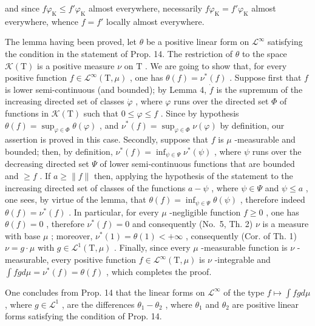 and since \(f\varphi_{\mathrm{K}} \leqslant f'\varphi_{\mathrm{K}}\) almost everywhere, necessarily \(f\varphi_{\mathrm{K}} = f'\varphi_{\mathrm{K}}\) almost everywhere, whence \(f = f'\) locally almost everywhere.

The lemma having been proved, let \(\theta\) be a positive linear form on \(\mathcal{L}^{\infty}\) satisfying the condition in the statement of Prop. 14. The restriction of \(\theta\) to the space \(\mathcal{K}(\mathrm{T})\) is a positive measure \(\nu\) on \(\mathrm{T}\) . We are going to show that, for every positive function \(f\in \mathcal{L}^{\infty}(\mathrm{T},\mu)\) , one has \(\theta (f) = \nu^{*}(f)\) . Suppose first that \(f\) is lower semi-continuous (and bounded); by Lemma 4, \(\dot{f}\) is the supremum of the increasing directed set of classes \(\dot{\varphi}\) , where \(\varphi\) runs over the directed set \(\Phi\) of functions in \(\mathcal{K}(\mathrm{T})\) such that \(0\leqslant \varphi \leqslant f\) . Since by hypothesis \(\theta (f) = \sup_{\varphi \in \Phi}\theta (\varphi)\) , and \(\nu^{*}(f) = \sup_{\varphi \in \Phi}\nu (\varphi)\) by definition, our assertion is proved in this case. Secondly, suppose that \(f\) is \(\mu\) -measurable and bounded; then, by definition, \(\nu^{*}(f) = \inf_{\psi \in \Psi}\nu^{*}(\psi)\) , where \(\psi\) runs over the decreasing directed set \(\Psi\) of lower semi-continuous functions that are bounded and \(\geqslant f\) . If \(a\geqslant \| f\|\) then, applying the hypothesis of the statement to the increasing directed set of classes of the functions \(a - \psi\) , where \(\psi \in \Psi\) and \(\psi \leqslant a\) , one sees, by virtue of the lemma, that \(\theta (f) = \inf_{\psi \in \Psi}\theta (\psi)\) , therefore indeed \(\theta (f) = \nu^{*}(f)\) . In particular, for every \(\mu\) -negligible function \(f\geqslant 0\) , one has \(\theta (f) = 0\) , therefore \(\nu^{*}(f) = 0\) and consequently (No.~5, Th. 2) \(\nu\) is a measure with base \(\mu\) ; moreover, \(\nu^{*}(1) = \theta (1) < +\infty\) , consequently (Cor. of Th. 1) \(\nu = g\cdot \mu\) with \(g\in \mathcal{L}^1 (\mathrm{T},\mu)\) . Finally, since every \(\mu\) -measurable function is \(\nu\) -measurable, every positive function \(f\in \mathcal{L}^{\infty}(\mathrm{T},\mu)\) is \(\nu\) -integrable and \(\int fg d\mu = \nu^{*}(f) = \theta (f)\) , which completes the proof.

One concludes from Prop. 14 that the linear forms on \(\mathcal{L}^{\infty}\) of the type \(f\mapsto \int fg d\mu\) , where \(g\in \mathcal{L}^{1}\) , are the differences \(\theta_{1} - \theta_{2}\) , where \(\theta_{1}\) and \(\theta_{2}\) are positive linear forms satisfying the condition of Prop. 14.

